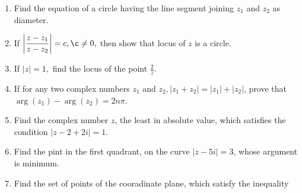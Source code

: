 \begin{enumerate}[resume]
\item Find the equation of a circle having the line segment joining $z_1$ and $z_2$ as diameter.
\item If $\left|\frac{z - z_1}{z - z_2}\right| = c, \c\neq 0,$ then show that locus of $z$ is a circle.
\item If $|z| = 1,$ find the locus of the point $\frac{2}{z}$.
\item If for any two complex numbers $z_1$ and $z_2, |z_1 + z_2| = |z_1| + |z_2|$, prove that $\arg(z_1) - \arg(z_2) = 2n\pi$.
\item Find the complex number $z$, the least in absolute value, which satisfies the condition $|z - 2 + 2i| = 1$.
\item Find the pint in the first quadrant, on the curve $|z - 5i| = 3$, whose argument is minimum.
\item Find the set of points of the cooradinate plane, which satisfy the inequality


\end{enumerate}
